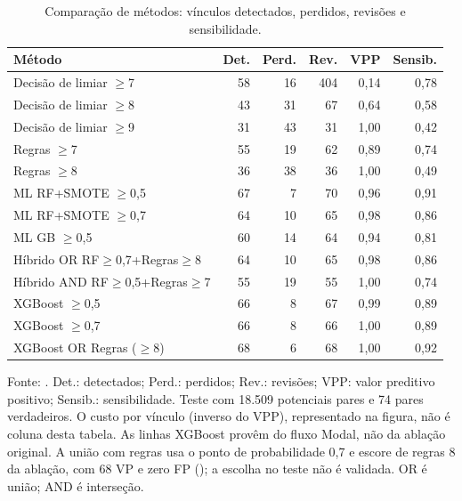 \begin{table}[htbp]
\centering
\caption{Comparação de métodos: vínculos detectados, perdidos, revisões e sensibilidade.}
\label{tab:impacto-epidemiologico}
\footnotesize
\begin{tabular}{@{}lrrrrr@{}}
\toprule
Método & Det. & Perd. & Rev. & VPP & Sensib. \\
\midrule
Decisão de limiar $\geq$7 & 58 & 16 & 404 & 0,14 & 0,78 \\
Decisão de limiar $\geq$8 & 43 & 31 & 67 & 0,64 & 0,58 \\
Decisão de limiar $\geq$9 & 31 & 43 & 31 & 1,00 & 0,42 \\
Regras $\geq$7 & 55 & 19 & 62 & 0,89 & 0,74 \\
Regras $\geq$8 & 36 & 38 & 36 & 1,00 & 0,49 \\
ML RF+SMOTE $\geq$0,5 & 67 & 7 & 70 & 0,96 & 0,91 \\
ML RF+SMOTE $\geq$0,7 & 64 & 10 & 65 & 0,98 & 0,86 \\
ML GB $\geq$0,5 & 60 & 14 & 64 & 0,94 & 0,81 \\
Híbrido OR RF$\geq$0,7+Regras$\geq$8 & 64 & 10 & 65 & 0,98 & 0,86 \\
Híbrido AND RF$\geq$0,5+Regras$\geq$7 & 55 & 19 & 55 & 1,00 & 0,74 \\
XGBoost $\geq$0,5 & 66 & 8 & 67 & 0,99 & 0,89 \\
XGBoost $\geq$0,7 & 66 & 8 & 66 & 1,00 & 0,89 \\
XGBoost OR Regras ($\geq8$) & 68 & 6 & 68 & 1,00 & 0,92 \\
\bottomrule
\end{tabular}
\par\footnotesize Fonte: . Det.: detectados; Perd.: perdidos; Rev.: revisões; VPP: valor preditivo positivo; Sensib.: sensibilidade. Teste com 18.509 potenciais pares e 74 pares verdadeiros. O custo por vínculo (inverso do VPP), representado na figura, não é coluna desta tabela. As linhas XGBoost provêm do fluxo Modal, não da ablação original. A união com regras usa o ponto de probabilidade 0,7 e escore de regras 8 da ablação, com 68 VP e zero FP (); a escolha no teste não é validada. OR é união; AND é interseção.
\end{table}

